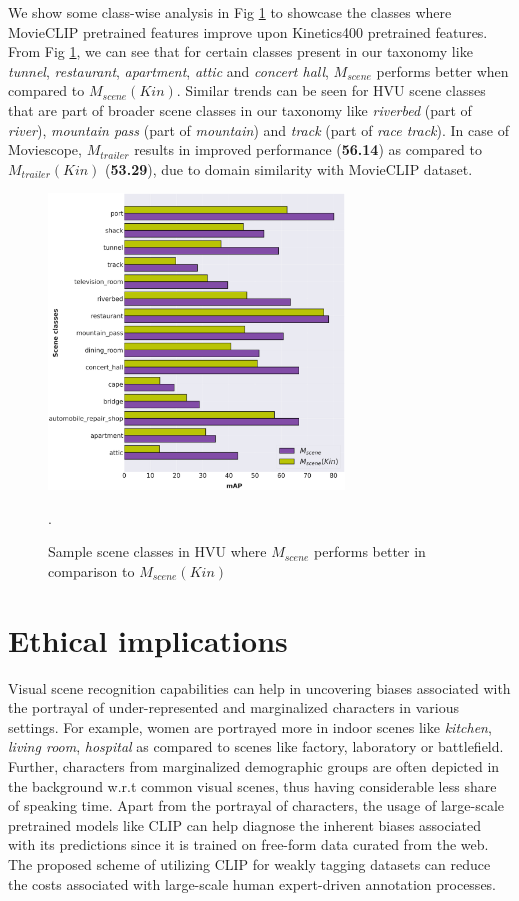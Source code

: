 We show some class-wise analysis in Fig \ref{scenegtbase} to showcase the classes where MovieCLIP pretrained features improve upon Kinetics400 pretrained features. From Fig \ref{scenegtbase}, we can see that for certain classes present in our taxonomy like \textit{tunnel}, \textit{restaurant}, \textit{apartment}, \textit{attic} and \textit{concert hall}, $M_{scene}$ performs better when compared to $M_{scene}(Kin)$. Similar trends can be seen for HVU scene classes that are part of broader scene classes in our taxonomy like \textit{riverbed} (part of \textit{river}), \textit{mountain pass} (part of \textit{mountain}) and \textit{track} (part of \textit{race track}).
In case of Moviescope, $M_{trailer}$ 
results in improved performance (\textbf{56.14}) as compared to $M_{trailer}(Kin)$ (\textbf{53.29}), due to domain similarity with MovieCLIP dataset. 
\begin{figure}[h!]
    \centering
    \includegraphics[width=0.7\textwidth]{figures/scene_gt_base_model_updated_legend.png}
    \caption{Sample scene classes in HVU where $M_{scene}$ performs better in comparison to $M_{scene}(Kin)$}. 
    \label{scenegtbase}
\end{figure}
\section{Ethical implications}
Visual scene recognition capabilities can help in uncovering biases associated with the portrayal of under-represented and marginalized characters in various settings. For example, women are portrayed more in indoor scenes like \textit{kitchen}, \textit{living room}, \textit{hospital} as compared to scenes like factory, laboratory or battlefield. Further, characters from marginalized demographic groups are often depicted in the background w.r.t common visual scenes, thus having considerable less share of speaking time. Apart from the portrayal of characters, the usage of large-scale pretrained models like CLIP \cite{CLIP} can help diagnose the inherent biases associated with its predictions since it is trained on free-form data curated from the web. The proposed scheme of utilizing CLIP for weakly tagging datasets can reduce the costs associated with large-scale human expert-driven annotation processes.
